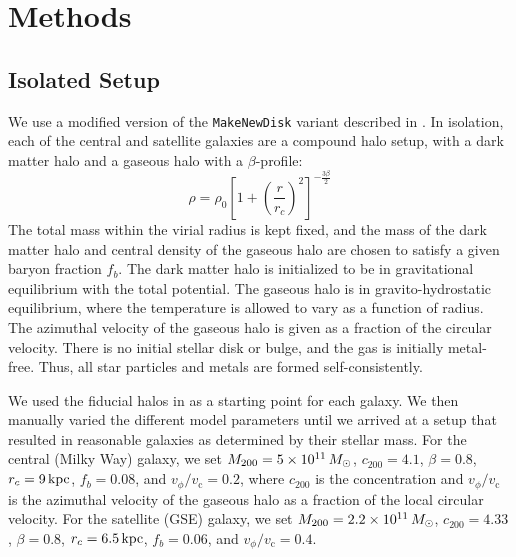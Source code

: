 \section{Methods}\label{sec:methods}
\subsection{Isolated Setup}\label{ssec:iso_setup}
We use a modified version of the \texttt{MakeNewDisk} variant described in \citet{2023MNRAS.tmp.2070B}. In isolation, each of the central and satellite galaxies are a compound halo setup, with a \citet{1990ApJ...356..359H} dark matter halo and a gaseous halo with a $\beta$-profile:
\begin{equation*}
\rho = \rho_0 \left[1 + \left(\frac{r}{r_c}\right)^2\right]^{-\frac{3\beta}{2}}
\end{equation*}
The total mass within the virial radius is kept fixed, and the mass of the dark matter halo and central density of the gaseous halo are chosen to satisfy a given baryon fraction $f_b$. The dark matter halo is initialized to be in gravitational equilibrium with the total potential. The gaseous halo is in gravito-hydrostatic equilibrium, where the temperature is allowed to vary as a function of radius. The azimuthal velocity of the gaseous halo is given as a fraction of the circular velocity. There is no initial stellar disk or bulge, and the gas is initially metal-free. Thus, all star particles and metals are formed self-consistently.

We used the fiducial halos in \citet{2021ApJ...923...92N} as a starting point for each galaxy. We then manually varied the different model parameters until we arrived at a setup that resulted in reasonable galaxies as determined by their stellar mass. For the central (Milky Way) galaxy, we set $M_{200}=5\times10^{11}\,M_{\odot}$, $c_{200}=4.1$, $\beta=0.8$, $r_c=9\,\textrm{kpc}$, $f_b=0.08$, and $v_{\phi}/v_{\textrm{c}}=0.2$, where $c_{200}$ is the concentration and $v_{\phi}/v_{\textrm{c}}$ is the azimuthal velocity of the gaseous halo as a fraction of the local circular velocity. For the satellite (GSE) galaxy, we set $M_{200}=2.2\times10^{11}\,M_{\odot}$, $c_{200}=4.33$, $\beta=0.8$, $r_c=6.5\,\textrm{kpc}$, $f_b=0.06$, and $v_{\phi}/v_{\textrm{c}}=0.4$.


